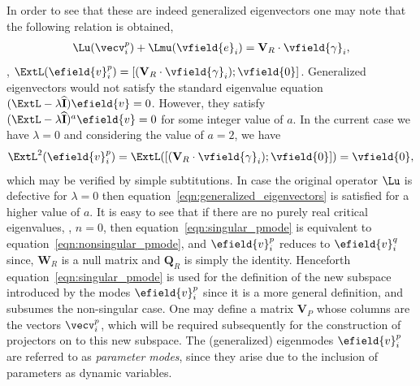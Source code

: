 In order to see that these are indeed generalized eigenvectors one may note that the following relation is obtained,
\begin{eqnarray}
	\Lu(\vecv^{p}_{i}) + \Lmu(\vfield{e}_{i}) = \mathbf{V}_{R}\cdot\vfield{\gamma}_{i},
\end{eqnarray}
\ie, $\ExtL(\efield{v}^{p}_{i}) = [(\mathbf{V}_{R}\cdot\vfield{\gamma}_{i}); \vfield{0}]$. Generalized eigenvectors would not satisfy the standard eigenvalue equation $(\ExtL - \lambda\mathbf{\widehat{I}})\efield{v} = 0$. However, they satisfy $(\ExtL - \lambda\mathbf{\widehat{I}})^{a}\efield{v} = 0$ for some integer value of $a$. In the current case we have $\lambda = 0$ and considering the value of $a=2$, we have
\begin{eqnarray}
	\label{eqn:generalized_eigenvectors}
	\ExtL^{2}(\efield{v}^{p}_{i}) = \ExtL([(\mathbf{V}_{R}\cdot\vfield{\gamma}_{i}); \vfield{0}]) = \vfield{0},
\end{eqnarray}
which may be verified by simple subtitutions. In case the original operator $\Lu$ is defective for $\lambda = 0$ then equation~\eqref{eqn:generalized_eigenvectors} is satisfied for a higher value of $a$. 
It is easy to see that if there are no purely real critical eigenvalues, \ie, $n = 0$, then equation~\eqref{eqn:singular_pmode} is equivalent to equation~\eqref{eqn:nonsingular_pmode}, and $\efield{v}^{p}_{i}$ reduces to $\efield{v}^{q}_{i}$ since, $\mathbf{W}_{R}$ is a null matrix and $\mathbf{Q}_{R}$ is simply the identity. Henceforth equation~\eqref{eqn:singular_pmode} is used for the definition of the new subspace introduced by the modes $\efield{v}^{p}_{i}$ since it is a more general definition, and subsumes the non-singular case. One may define a matrix $\mathbf{V}_{P}$ whose columns are the vectors $\vecv^{p}_{i}$, which will be required subsequently for the construction of projectors on to this new subspace. The (generalized) eigenmodes $\efield{v}^{p}_{i}$ are referred to as \emph{parameter modes}, since they arise due to the inclusion of parameters as dynamic variables.

